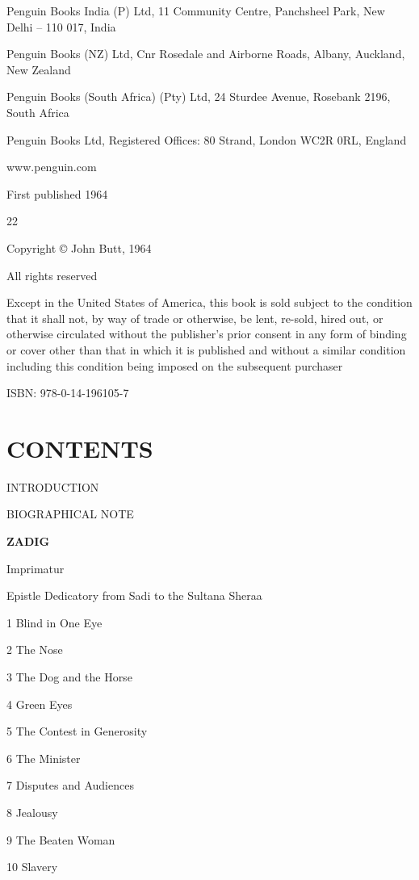 \documentclass{article}
\begin{document}
\begin{center}
Penguin Books India (P) Ltd, 11 Community Centre, Panchsheel Park, New Delhi – 
110 017, India 

Penguin Books (NZ) Ltd, Cnr Rosedale and Airborne Roads, Albany, Auckland, New 
Zealand 

Penguin Books (South Africa) (Pty) Ltd, 24 Sturdee Avenue, Rosebank 2196, South 
Africa 

Penguin Books Ltd, Registered Offices: 80 Strand, London WC2R 0RL, England 

www.penguin.com 

First published 1964 

22 

Copyright © John Butt, 1964 

All rights reserved 

Except in the United States of America, this book is sold subject to the condition 
that it shall not, by way of trade or otherwise, be lent, re-sold, hired out, or 
otherwise circulated without the publisher's prior consent in any form of binding 
or cover other than that in which it is published and without a similar condition 
including this condition being imposed on the subsequent purchaser 

ISBN: 978-0-14-196105-7\pagebreak{} 

\section*{\textbf{CONTENTS }}

INTRODUCTION 

BIOGRAPHICAL NOTE 

\begin{center}
\textbf{ZADIG }
\end{center}

\baselineskip=12pt
\leftskip=0pt
Imprimatur 

Epistle Dedicatory from Sadi to the Sultana Sheraa 

1 Blind in One Eye 

2 The Nose 

3 The Dog and the Horse 

4 Green Eyes 

5 The Contest in Generosity 

6 The Minister 

7 Disputes and Audiences 

8 Jealousy 

9 The Beaten Woman 

10 Slavery 


\end{center}
\end{document}
